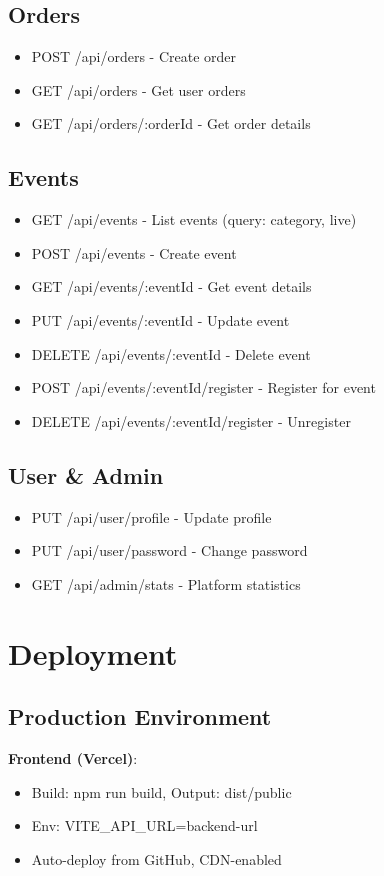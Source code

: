 \documentclass[11pt]{scrreprt}
\begin{document}
\section{Orders}
\begin{itemize}
\item POST /api/orders - Create order
\item GET /api/orders - Get user orders
\item GET /api/orders/:orderId - Get order details
\end{itemize}

\section{Events}
\begin{itemize}
\item GET /api/events - List events (query: category, live)
\item POST /api/events - Create event
\item GET /api/events/:eventId - Get event details
\item PUT /api/events/:eventId - Update event
\item DELETE /api/events/:eventId - Delete event
\item POST /api/events/:eventId/register - Register for event
\item DELETE /api/events/:eventId/register - Unregister
\end{itemize}

\section{User \& Admin}
\begin{itemize}
\item PUT /api/user/profile - Update profile
\item PUT /api/user/password - Change password
\item GET /api/admin/stats - Platform statistics
\end{itemize}

\chapter{Deployment}

\section{Production Environment}
\textbf{Frontend (Vercel)}:
\begin{itemize}
\item Build: npm run build, Output: dist/public
\item Env: VITE\_API\_URL=backend-url
\item Auto-deploy from GitHub, CDN-enabled
\end{itemize}
\end{document}
